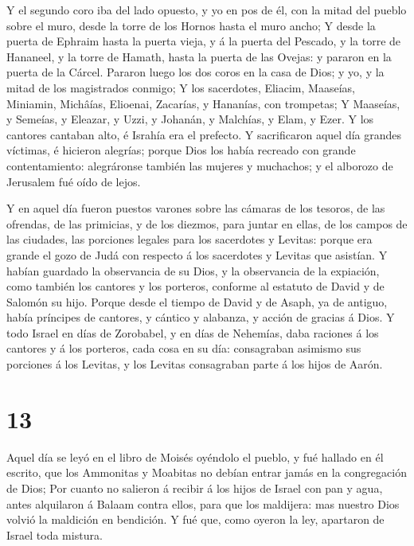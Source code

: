  Y el segundo coro iba del lado opuesto, y yo en pos de él,
con la mitad del pueblo sobre el muro, desde la torre de los Hornos
hasta el muro ancho;  Y desde la puerta de Ephraim hasta la
puerta vieja, y á la puerta del Pescado, y la torre de Hananeel, y la
torre de Hamath, hasta la puerta de las Ovejas: y pararon en la puerta
de la Cárcel.  Pararon luego los dos coros en la casa de
Dios; y yo, y la mitad de los magistrados conmigo;  Y los
sacerdotes, Eliacim, Maaseías, Miniamin, Michâías, Elioenai, Zacarías, y
Hananías, con trompetas;  Y Maaseías, y Semeías, y Eleazar,
y Uzzi, y Johanán, y Malchías, y Elam, y Ezer. Y los cantores cantaban
alto, é Israhía era el prefecto.  Y sacrificaron aquel día
grandes víctimas, é hicieron alegrías; porque Dios los había recreado
con grande contentamiento: alegráronse también las mujeres y muchachos;
y el alborozo de Jerusalem fué oído de lejos.

 Y en aquel día fueron puestos varones sobre las cámaras de
los tesoros, de las ofrendas, de las primicias, y de los diezmos, para
juntar en ellas, de los campos de las ciudades, las porciones legales
para los sacerdotes y Levitas: porque era grande el gozo de Judá con
respecto á los sacerdotes y Levitas que asistían.  Y habían
guardado la observancia de su Dios, y la observancia de la expiación,
como también los cantores y los porteros, conforme al estatuto de David
y de Salomón su hijo.  Porque desde el tiempo de David y de
Asaph, ya de antiguo, había príncipes de cantores, y cántico y alabanza,
y acción de gracias á Dios.  Y todo Israel en días de
Zorobabel, y en días de Nehemías, daba raciones á los cantores y á los
porteros, cada cosa en su día: consagraban asimismo sus porciones á los
Levitas, y los Levitas consagraban parte á los hijos de Aarón.

\hypertarget{section-12}{%
\section{13}\label{section-12}}

 Aquel día se leyó en el libro de Moisés oyéndolo el pueblo,
y fué hallado en él escrito, que los Ammonitas y Moabitas no debían
entrar jamás en la congregación de Dios;  Por cuanto no
salieron á recibir á los hijos de Israel con pan y agua, antes
alquilaron á Balaam contra ellos, para que los maldijera: mas nuestro
Dios volvió la maldición en bendición.  Y fué que, como
oyeron la ley, apartaron de Israel toda mistura.


